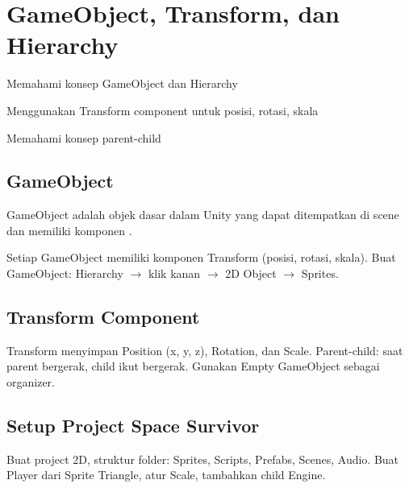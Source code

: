 \section{GameObject, Transform, dan Hierarchy}

\begin{learningoutcomes}
\item Memahami konsep GameObject dan Hierarchy
\item Menggunakan Transform component untuk posisi, rotasi, skala
\item Memahami konsep parent-child
\end{learningoutcomes}

\subsection{GameObject}

\begin{definisi}[GameObject]
GameObject adalah objek dasar dalam Unity yang dapat ditempatkan di scene dan memiliki komponen \cite{UnityManual2024}.
\end{definisi}

Setiap GameObject memiliki komponen Transform (posisi, rotasi, skala). Buat GameObject: Hierarchy $\rightarrow$ klik kanan $\rightarrow$ 2D Object $\rightarrow$ Sprites.

\subsection{Transform Component}

Transform menyimpan Position (x, y, z), Rotation, dan Scale. Parent-child: saat parent bergerak, child ikut bergerak. Gunakan Empty GameObject sebagai organizer.

\subsection{Setup Project Space Survivor}

Buat project 2D, struktur folder: Sprites, Scripts, Prefabs, Scenes, Audio. Buat Player dari Sprite Triangle, atur Scale, tambahkan child Engine.
